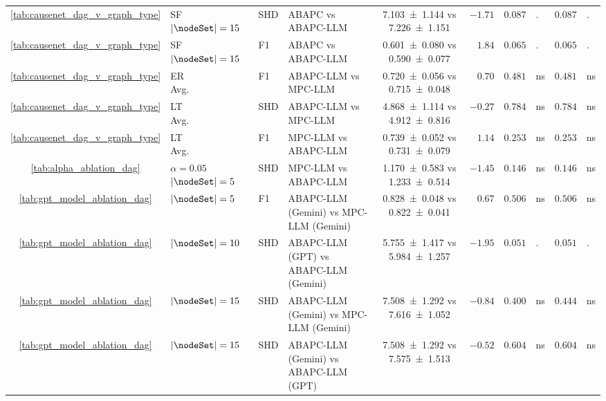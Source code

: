 \begin{table}[t]
{\begin{tabular}{cll l|c|r|rl|rl}
    \midrule
    \ref{tab:causenet_dag_v_graph_type} & \shortstack[l]{SF\\$|\nodeSet|=15$} & SHD & ABAPC vs ABAPC-LLM & \num{7.103 +- 1.144} vs \num{7.226 +- 1.151} & $-1.71$ & $0.087$ & \!\!\!. & $0.087$ & \!\!\!. \\
    \ref{tab:causenet_dag_v_graph_type} & \shortstack[l]{SF\\$|\nodeSet|=15$} & F1 & ABAPC vs ABAPC-LLM & \num{0.601 +- 0.080} vs \num{0.590 +- 0.077} & $1.84$ & $0.065$ & \!\!\!. & $0.065$ & \!\!\!. \\
    \midrule
    \ref{tab:causenet_dag_v_graph_type} & \shortstack[l]{ER\\Avg.} & F1 & ABAPC-LLM vs MPC-LLM & \num{0.720 +- 0.056} vs \num{0.715 +- 0.048} & $0.70$ & $0.481$ & \!\!\!ns & $0.481$ & \!\!\!ns \\
    \midrule
    \ref{tab:causenet_dag_v_graph_type} & \shortstack[l]{LT\\Avg.} & SHD & ABAPC-LLM vs MPC-LLM & \num{4.868 +- 1.114} vs \num{4.912 +- 0.816} & $-0.27$ & $0.784$ & \!\!\!ns & $0.784$ & \!\!\!ns \\
    \ref{tab:causenet_dag_v_graph_type} & \shortstack[l]{LT\\Avg.} & F1 & MPC-LLM vs ABAPC-LLM & \num{0.739 +- 0.052} vs \num{0.731 +- 0.079} & $1.14$ & $0.253$ & \!\!\!ns & $0.253$ & \!\!\!ns \\
    \midrule
    \ref{tab:alpha_ablation_dag} & \shortstack[l]{$\alpha=0.05$\\$|\nodeSet|=5$} & SHD & MPC-LLM vs ABAPC-LLM & \num{1.170 +- 0.583} vs \num{1.233 +- 0.514} & $-1.45$ & $0.146$ & \!\!\!ns & $0.146$ & \!\!\!ns \\
    \midrule
    \ref{tab:gpt_model_ablation_dag} & $|\nodeSet|=5$ & F1 & ABAPC-LLM (Gemini) vs MPC-LLM (Gemini) & \num{0.828 +- 0.048} vs \num{0.822 +- 0.041} & $0.67$ & $0.506$ & \!\!\!ns & $0.506$ & \!\!\!ns \\
    \midrule
    \ref{tab:gpt_model_ablation_dag} & $|\nodeSet|=10$ & SHD & ABAPC-LLM (GPT) vs ABAPC-LLM (Gemini) & \num{5.755 +- 1.417} vs \num{5.984 +- 1.257} & $-1.95$ & $0.051$ & \!\!\!. & $0.051$ & \!\!\!. \\
    \midrule
    \ref{tab:gpt_model_ablation_dag} & $|\nodeSet|=15$ & SHD & ABAPC-LLM (Gemini) vs MPC-LLM (Gemini) & \num{7.508 +- 1.292} vs \num{7.616 +- 1.052} & $-0.84$ & $0.400$ & \!\!\!ns & $0.444$ & \!\!\!ns \\
    \ref{tab:gpt_model_ablation_dag} & $|\nodeSet|=15$ & SHD & ABAPC-LLM (Gemini) vs ABAPC-LLM (GPT) & \num{7.508 +- 1.292} vs \num{7.575 +- 1.513} & $-0.52$ & $0.604$ & \!\!\!ns & $0.604$ & \!\!\!ns \\

\end{tabular}}
\end{table}
